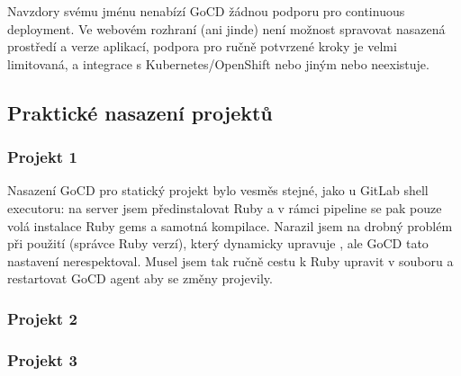         Navzdory svému jménu nenabízí GoCD žádnou podporu pro continuous deployment. Ve webovém rozhraní (ani jinde) není možnost spravovat nasazená prostředí a verze aplikací, podpora pro ručně potvrzené kroky je velmi limitovaná, a integrace s Kubernetes/OpenShift nebo jiným  nebo neexistuje.

    \subsection{Praktické nasazení projektů}
        \subsubsection{Projekt 1}
            Nasazení GoCD pro statický projekt bylo vesměs stejné, jako u GitLab shell executoru: na server jsem předinstalovat Ruby a v rámci pipeline se pak pouze volá instalace Ruby gems a samotná kompilace. Narazil jsem na drobný problém při použití  (správce Ruby verzí), který dynamicky upravuje , ale GoCD tato nastavení nerespektoval. Musel jsem tak ručně cestu k Ruby upravit v souboru  a restartovat GoCD agent aby se změny projevily.

        \subsubsection{Projekt 2}
            \blind[2]

        \subsubsection{Projekt 3}
            \blind[2]
